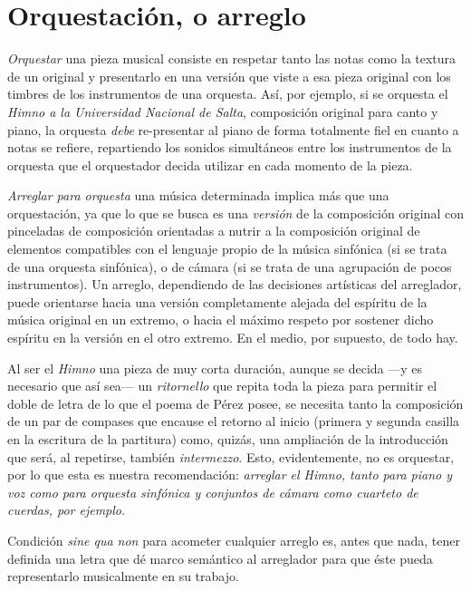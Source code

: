\section{Orquestación, o arreglo}
\label{sec:orquestacion-arreglo}

\emph{Orquestar} una pieza musical consiste en respetar tanto las notas como la textura de un original y presentarlo en una versión que viste a esa pieza original con los timbres de los instrumentos de una orquesta. Así, por ejemplo, si se orquesta el \emph{Himno a la Universidad Nacional de Salta}, composición original para canto y piano, la orquesta \emph{debe} re-presentar al piano de forma totalmente fiel en cuanto a notas se refiere, repartiendo los sonidos simultáneos entre los instrumentos de la orquesta que el orquestador decida utilizar en cada momento de la pieza.

\emph{Arreglar para orquesta} una música determinada implica más que una orquestación, ya que lo que se busca es una \emph{versión} de la composición original con pinceladas de composición orientadas a nutrir a la composición original de elementos compatibles con el lenguaje propio de la música sinfónica (si se trata de una orquesta sinfónica), o de cámara (si se trata de una agrupación de pocos instrumentos). Un arreglo, dependiendo de las decisiones artísticas del arreglador, puede orientarse hacia una versión completamente alejada del espíritu de la música original en un extremo, o hacia el máximo respeto por sostener dicho espíritu en la versión en el otro extremo. En el medio, por supuesto, de todo hay.

Al ser el \emph{Himno} una pieza de muy corta duración, aunque se decida ---y es necesario que así sea--- un \emph{ritornello} que repita toda la pieza para permitir el doble de letra de lo que el poema de Pérez posee, se necesita tanto la composición de un par de compases que encause el retorno al inicio (primera y segunda casilla en la escritura de la partitura) como, quizás, una ampliación de la introducción que será, al repetirse, también \emph{intermezzo}. Esto, evidentemente, no es orquestar, por lo que esta es nuestra recomendación: \emph{arreglar el \emph{Himno}, tanto para piano y voz como para orquesta sinfónica y conjuntos de cámara como cuarteto de cuerdas, por ejemplo.}

Condición \emph{sine qua non} para acometer cualquier arreglo es, antes que nada, tener definida una letra que dé marco semántico al arreglador para que éste pueda representarlo musicalmente en su trabajo.
